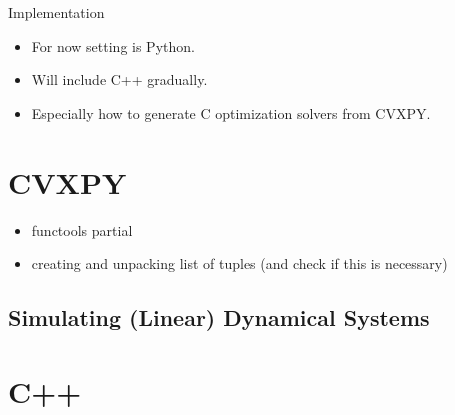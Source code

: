\begin{chapter}{Implementation}

    \begin{itemize}
        \item For now setting is Python.
        \item Will include C++ gradually.
        \item Especially how to generate C optimization solvers from CVXPY.
    \end{itemize}

    \section{CVXPY}
    \begin{itemize}
        \item functools partial
        \item creating and unpacking list of tuples (and check if this is necessary)
    \end{itemize}

    \subsection{Simulating (Linear) Dynamical Systems}

    \section{C++}





\end{chapter}
